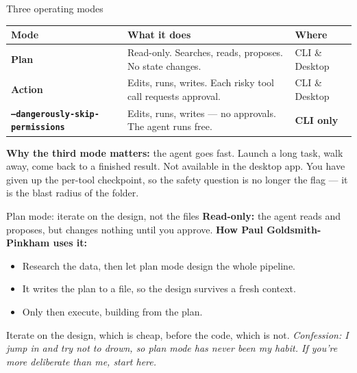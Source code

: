 \documentclass[aspectratio=169,11pt]{beamer}
\begin{document}
\begin{frame}{Three operating modes}

\footnotesize

\begin{center}
\renewcommand{\arraystretch}{1.4}
\begin{tabular}{@{}p{}p{}l@{}}
\toprule
\textbf{Mode} & \textbf{What it does} & \textbf{Where} \\
\midrule
\textbf{Plan} & Read-only. Searches, reads, proposes. No state changes. & CLI \& Desktop \\
\textbf{Action} & Edits, runs, writes. Each risky tool call requests approval. & CLI \& Desktop \\
\textbf{\texttt{--dangerously-skip-permissions}} & Edits, runs, writes --- no approvals. The agent runs free. & \textbf{CLI only} \\
\bottomrule
\end{tabular}
\end{center}

\vspace{0.25cm}

\textbf{Why the third mode matters:} the agent goes fast. Launch a long task, walk away, come back to a finished result. Not available in the desktop app. You have given up the per-tool checkpoint, so the safety question is no longer the flag --- it is the blast radius of the folder.

\end{frame}

\begin{frame}{Plan mode: iterate on the design, not the files}
\textbf{Read-only:} the agent reads and proposes, but changes nothing until you approve.
\vspace{0.45cm}
\textbf{How Paul Goldsmith-Pinkham uses it:}
\begin{itemize}\setlength\itemsep{0.3em}
    \item Research the data, then let plan mode design the whole pipeline.
    \item It writes the plan to a file, so the design survives a fresh context.
    \item Only then execute, building from the plan.
\end{itemize}
\vspace{0.5cm}
\alert{Iterate on the design, which is cheap, before the code, which is not.}
\vspace{0.25cm}
{\small\color{warmgray}\textit{Confession: I jump in and try not to drown, so plan mode has never been my habit. If you're more deliberate than me, start here.}}
\end{frame}
\end{document}
